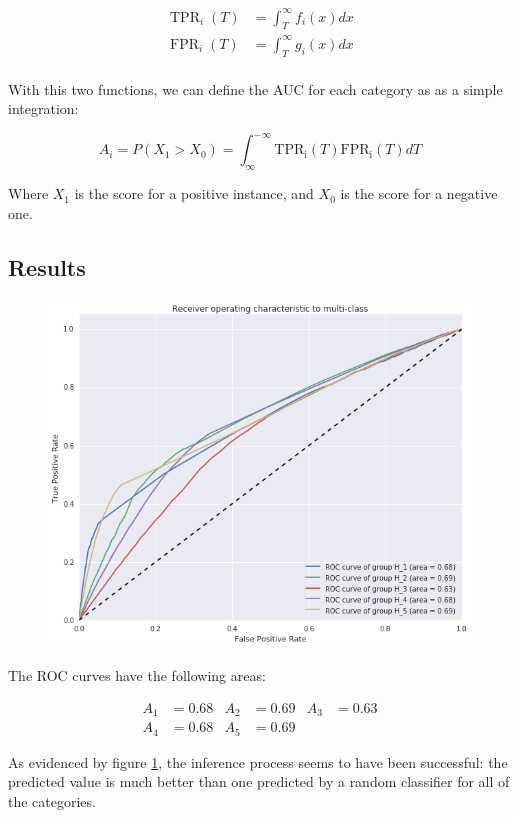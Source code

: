 \vspace{-1em}

\begin{align*}
\operatorname{TPR}_i(T) &= \int^{\infty}_T f_i(x) dx \\
\operatorname{FPR}_i(T) &= \int^{\infty}_T g_i(x) dx \\
\end{align*}

\vspace{-1.5em}

With this two functions, we can define the AUC for each category as as a simple integration:

\[
A_i = P(X_1 > X_0) = \int^{-\infty}_{\infty} \operatorname{TPR_i}(T) \operatorname{FPR_i}(T) dT
\]

Where $ X_1 $ is the score for a positive instance, and $ X_0 $ is the score for a negative one.

\subsection{Results}

\begin{figure}
\begin{center}
\includegraphics[width=\columnwidth]{figures/ROC_multiclass/ROC_multiclass.png}
\caption{ \protect}
\label{ROC_multiclass}
\end{center}
\end{figure}

The ROC curves have the following areas:

\begin{align*}
A_1 &= 0.68 & A_2 &= 0.69 & A_3 &= 0.63 \\ 
A_4 &= 0.68 & A_5 &= 0.69
\end{align*}

As evidenced by figure \ref{ROC_multiclass}, the inference process seems to have been successful: the predicted value is much better than one predicted by a random classifier for all of the categories.
